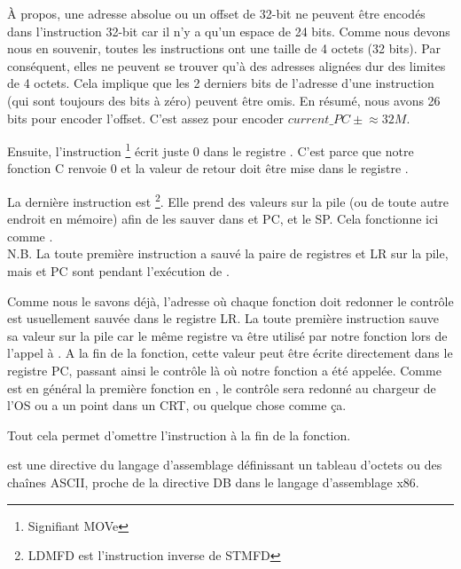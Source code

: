À propos, une adresse absolue ou un offset de 32-bit ne peuvent être encodés
dans l'instruction 32-bit  car il n'y a qu'un espace de 24 bits.
Comme nous devons nous en souvenir, toutes les instructions ont une taille de
4 octets (32 bits).
Par conséquent, elles ne peuvent se trouver qu'à des adresses alignées dur des
limites de 4 octets.
Cela implique que les 2 derniers bits de l'adresse d'une instruction (qui sont
toujours des bits à zéro) peuvent être omis.
En résumé, nous avons 26 bits pour encoder l'offset. C'est assez pour encoder
$current\_PC \pm{} \approx{}32M$.

Ensuite, l'instruction \footnote{Signifiant MOVe} écrit juste
0 dans le registre .
C'est parce que notre fonction C renvoie 0 et la valeur de retour doit être
mise dans le registre .

La dernière instruction est \footnote{\ac{LDMFD} est
l'instruction inverse de \ac{STMFD}}.
Elle prend des valeurs sur la pile (ou de toute autre endroit en mémoire)
afin de les sauver dans  et \ac{PC}, et 
le  \ac{SP}.
Cela fonctionne ici comme \POP.\\
N.B. La toute première instruction  a sauvé la paire de registres
 et \ac{LR} sur la pile, mais  et \ac{PC} sont 
pendant l'exécution de .

Comme nous le savons déjà, l'adresse où chaque fonction doit redonner le
contrôle est usuellement sauvée dans le registre \ac{LR}.
La toute première instruction sauve sa valeur sur la pile car le même
registre va être utilisé par notre fonction \main lors de l'appel à \printf.
A la fin de la fonction, cette valeur peut être écrite directement dans le
registre \ac{PC}, passant ainsi le contrôle là où notre fonction a été appelée.
Comme \main est en général la première fonction en \CCpp, le contrôle sera
redonné au chargeur de l'\ac{OS} ou a un point dans un \ac{CRT}, ou quelque
chose comme ça.

Tout cela permet d'omettre l'instruction  à la fin de la fonction.

 est une directive du langage d'assemblage définissant un tableau d'octets
ou des chaînes ASCII, proche de la directive DB dans le langage d'assemblage x86.

